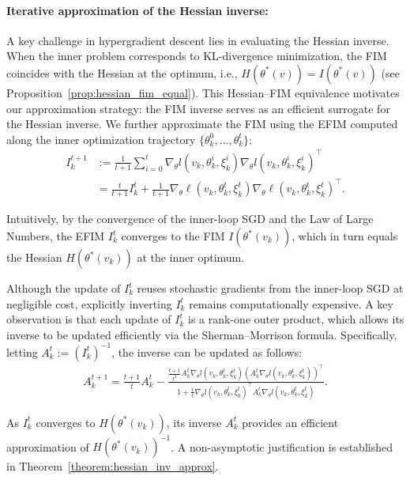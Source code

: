 \documentclass[11 pt]{article}
\begin{document}
\paragraph{Iterative approximation of the Hessian inverse:} 
A key challenge in hypergradient descent lies in evaluating the Hessian inverse. 
When the inner problem corresponds to KL-divergence minimization, the FIM coincides with the Hessian at the optimum, i.e.,
$H(\theta^*(v)) = I(\theta^*(v))$ (see Proposition~\ref{prop:hessian_fim_equal}). 
This Hessian--FIM equivalence motivates our approximation strategy: the FIM inverse serves as an efficient surrogate for the Hessian inverse. 
We further approximate the FIM using the EFIM computed along the inner optimization trajectory $\{\theta_k^{0}, \ldots, \theta_k^{t}\}$:
\begin{align*}
    I_k^{t+1} &:= \frac{1}{t+1}\sum_{i=0}^{t}\nabla_\theta l(v_k,\theta_k^{i},\xi_k^i)\nabla_\theta l(v_k,\theta_k^{i},\xi_k^i)^\top \nonumber\\
    &=\frac{t}{t+1}I_k^{t} + \frac{1}{t+1}\nabla_\theta \ell(v_k,\theta_k^{t},\xi_k^t)\nabla_\theta \ell(v_k,\theta_k^{t},\xi_k^t)^\top.
\end{align*}

Intuitively, by the convergence of the inner-loop SGD and the Law of Large Numbers, the EFIM $I_k^{t}$ converges to the FIM $I(\theta^*(v_k))$, which in turn equals the Hessian $H(\theta^*(v_k))$ at the inner optimum.
 

Although the update of $I_k^t$ reuses stochastic gradients from the inner-loop SGD at negligible cost, explicitly inverting $I_k^t$ remains computationally expensive. A key observation is that each update of $I_k^t$
 is a rank-one outer product, which allows its inverse to be updated efficiently via the Sherman--Morrison formula. Specifically, letting $A_k^t := (I_k^t)^{-1}$, the inverse can be updated as follows:
\begin{align}\label{eq:inv_efim_update}
    A_k^{t+1}=\frac{t+1}{t}A_k^{t} -\frac{\frac{t+1}{{t}^2}A_k^{t}\nabla_\theta l (v_k,\theta_k^{t},\xi_k^t)\left(A_k^{t}\nabla_\theta l (v_k,\theta_k^{t},\xi_k^t)\right)^\top}{1+\frac{1}{t}\nabla_\theta l (v_k,\theta_k^{t},\xi_k^t)^\top A_k^{t}\nabla_\theta l (v_k,\theta_k^{t},\xi_k^t)}.
\end{align}

As $I_k^t$ converges to $H(\theta^*(v_k))$, its inverse $A_k^t$ provides an efficient approximation of $H(\theta^*(v_k))^{-1}$. A non-asymptotic justification is established in Theorem~\ref{theorem:hessian_inv_approx}.
\end{document}
